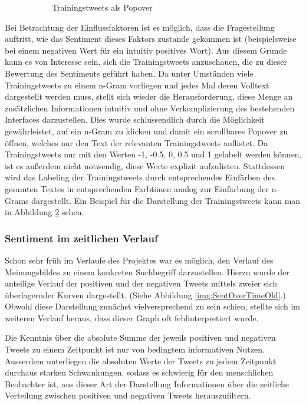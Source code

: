 \begin{figure}[ht]
\begin{subfigure}[t]{0.45\textwidth}
\caption{Trainingstweets als Popover}
\label{trainingstweets}
\end{subfigure}
\caption{}
\end{figure}

Bei Betrachtung der Einflussfaktoren ist es möglich, dass die Fragestellung auftritt, wie das Sentiment dieses Faktors zustande gekommen ist (beispielsweise bei einem negativen Wert für ein intuitiv positives Wort). Aus diesem Grunde kann es von Interesse sein, sich die Trainingstweets anzuschauen, die zu dieser Bewertung des Sentiments geführt haben. Da unter Umständen viele Trainingstweets zu einem n-Gram vorliegen und jedes Mal deren Volltext dargestellt werden muss, stellt sich wieder die Herausforderung, diese Menge an zusätzlichen Informationen intuitiv und ohne Verkomplizierung des bestehenden Interfaces darzustellen. Dies wurde schlussendlich durch die Möglichkeit gewährleistet, auf ein n-Gram zu klicken und damit ein scrollbares Popover zu öffnen, welches nur den Text der relevanten Trainingstweets auflistet. Da Trainingstweets nur mit den Werten -1, -0.5, 0, 0.5 und 1 gelabelt werden können, ist es außerdem nicht notwendig, diese Werte explizit aufzulisten. Stattdessen wird das Labeling der Trainingstweets durch entsprechendes Einfärben des gesamten Textes in entsprechenden Farbtönen analog zur Einfärbung der n-Grams dargestellt. Ein Beispiel für die Darstellung der Trainingstweets kann man in Abbildung \ref{trainingstweets} sehen.

\subsubsection{Sentiment im zeitlichen Verlauf}
Schon sehr früh im Verlaufe des Projektes war es möglich, den Verlauf des Meinungsbildes zu einem konkreten Suchbegriff darzustellen. Hierzu wurde der anteilige Verlauf der positiven und der negativen Tweets mittels zweier sich überlagernder Kurven dargestellt. (Siehe Abbildung \ref{img:SentOverTimeOld}.)
Obwohl diese Darstellung zunächst vielversprechend zu sein schien, stellte sich im weiteren Verlauf heraus, dass dieser Graph oft fehlinterpretiert wurde.

Die Kenntnis über die absolute Summe der jeweils positiven und negativen Tweets zu einem Zeitpunkt ist nur von bedingtem informativen Nutzen. Ausserdem unterliegen die absoluten Werte der Tweets zu jedem Zeitpunkt durchaus starken Schwankungen, sodass es schwierig für den menschlichen Beobachter ist, aus dieser Art der Darstellung Informationen über die zeitliche Verteilung zwischen positiven und negativen Tweets herauszufiltern.


